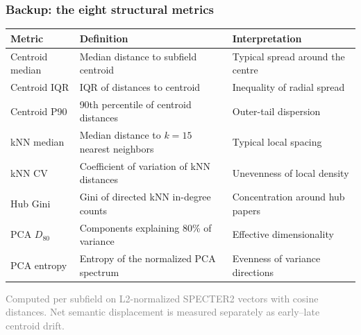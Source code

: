 \documentclass[
	11pt, %
	aspectratio=169, %
]{beamer}
\newcommand{\fignote}[1]{{\par\vspace{2pt}\footnotesize\textcolor{gray}{#1}\par}}
\begin{document}
\begin{frame}
	\frametitle{Backup: the eight structural metrics}

	\begin{table}
		\centering
		\footnotesize
		\begin{tabular}{@{}lll@{}}
			\toprule
			\textbf{Metric} & \textbf{Definition} & \textbf{Interpretation} \\
			\midrule
			Centroid median & Median distance to subfield centroid & Typical spread around the centre \\
			Centroid IQR & IQR of distances to centroid & Inequality of radial spread \\
			Centroid P90 & 90th percentile of centroid distances & Outer-tail dispersion \\
			kNN median & Median distance to $k=15$ nearest neighbors & Typical local spacing \\
			kNN CV & Coefficient of variation of kNN distances & Unevenness of local density \\
			Hub Gini & Gini of directed kNN in-degree counts & Concentration around hub papers \\
			PCA $D_{80}$ & Components explaining 80\% of variance & Effective dimensionality \\
			PCA entropy & Entropy of the normalized PCA spectrum & Evenness of variance directions \\
			\bottomrule
		\end{tabular}
	\end{table}

	\fignote{Computed per subfield on L2-normalized SPECTER2 vectors with cosine distances. Net semantic displacement is measured separately as early--late centroid drift.}
\end{frame}

\end{document}
